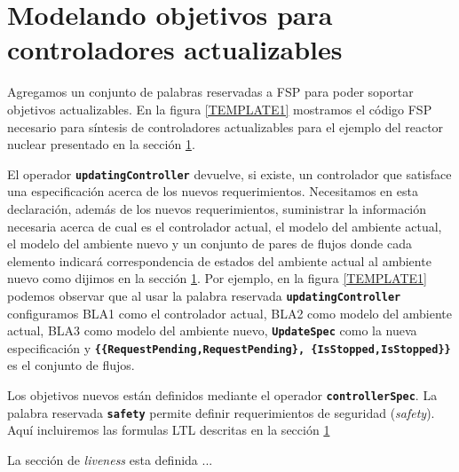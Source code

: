 \section{Modelando objetivos para controladores actualizables}

Agregamos un conjunto de palabras reservadas a FSP para poder soportar objetivos actualizables. En la figura
\ref{TEMPLATE1} mostramos el código FSP necesario para síntesis de controladores actualizables para el ejemplo del reactor nuclear
presentado en la sección \ref{}.

El operador \texttt{\textbf{updatingController}} devuelve, si existe, un controlador que satisface una especificación
acerca de los nuevos requerimientos. Necesitamos en esta declaración, además de los nuevos requerimientos, suministrar
la información necesaria acerca de cual es el controlador actual, el modelo del ambiente actual, el modelo del ambiente
nuevo y un conjunto de pares de flujos donde cada elemento indicará correspondencia de estados del ambiente actual al
ambiente nuevo como dijimos en la sección \ref{}. Por ejemplo, en la figura \ref{TEMPLATE1} podemos observar que
al usar la palabra reservada \texttt{\textbf{updatingController}} configuramos BLA1 como el controlador actual, BLA2
como modelo del ambiente actual, BLA3 como modelo del ambiente nuevo, \texttt{\textbf{UpdateSpec}} como la nueva
especificación y \texttt{\textbf{\{\{RequestPending,RequestPending\}, \{IsStopped,IsStopped\}\}}} es el conjunto de
flujos.

Los objetivos nuevos están definidos mediante el operador \texttt{\textbf{controllerSpec}}. La palabra reservada
\texttt{\textbf{safety}} permite definir requerimientos de seguridad (\emph{safety}). Aquí incluiremos las formulas
LTL descritas en la sección \ref{}

La sección de \emph{liveness} esta definida ... 

